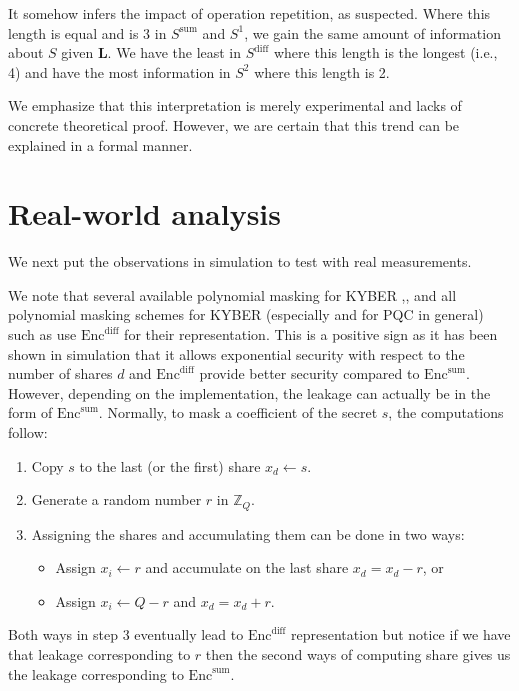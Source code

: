 \documentclass{llncs}
\begin{document}
	It somehow infers the impact of operation repetition, as suspected. Where this length is equal and is 3 in $S^\text{sum}$ and $S^1 $, we gain the same amount of information about $S$ given $\bm{L}$. We have the least in $S^\text{diff}$ where this length is the longest (i.e., 4) and have the most information in $S^2$ where this length is 2.
	
	We emphasize that this interpretation is merely experimental and lacks of concrete theoretical proof. However, we are certain that this trend can be explained in a formal manner.
	\section{Real-world analysis}\label{sec:onm}
	We next put the observations in simulation to test with real measurements.
	
	We note that several available polynomial masking for KYBER \cite{Kmaskimp0},\cite{Kmaskimp1}, \cite{Kmaskimp2} and all polynomial masking schemes for KYBER (especially and for PQC in general) such as \cite{Kmask1}  use $\text{Enc}^{\text{diff}}$ for their representation. This is a positive sign as it has been shown in simulation that it allows exponential security with respect to the number of shares $d$ and $\text{Enc}^{\text{diff}}$ provide better security compared to $\text{Enc}^{\text{sum}}$. However, depending on the implementation, the leakage can actually be in the form of $\text{Enc}^{\text{sum}}$. Normally, to mask a coefficient of the secret $s$, the computations follow:
	\begin{enumerate}
		\item Copy $s$ to the last (or the first) share $x_d \leftarrow s$.
		\item Generate a random number $r$ in $\mathbb{Z}_Q$.
		\item Assigning the shares and accumulating them can be done in two ways:
		\begin{itemize}
			\item Assign $x_i \leftarrow r$ and accumulate on the last share $x_d = x_d - r$, or
			\item Assign $x_i \leftarrow Q - r$ and $x_d = x_d + r$.
		\end{itemize}
	\end{enumerate}
	Both ways in step 3 eventually lead to $\text{Enc}^{\text{diff}}$ representation but notice if we have that leakage corresponding to $r$ then the second ways of computing share gives us the leakage corresponding to $\text{Enc}^{\text{sum}}$.
	
\end{document}
